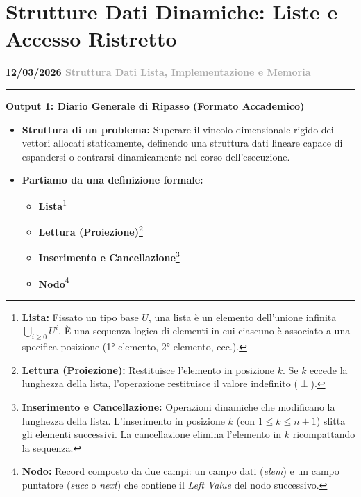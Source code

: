 \documentclass[a4paper, 11pt]{report}
\newcommand{\lezione}[2]{
\vspace{2em}
\noindent\textbf{\Large #1 \hfill \textcolor{darkgray}{#2}}
\vspace{0.5em}
\hrule
\vspace{1.5em}
}
\newcommand{\definizione}[2]{%
\textbf{#1}\footnote{\textbf{#1:} #2}%
}
\begin{document}
\chapter{Strutture Dati Dinamiche: Liste e Accesso Ristretto}

\lezione{12/03/2026}{Struttura Dati Lista, Implementazione e Memoria}
\vspace{0.5cm}
\textbf{Output 1: Diario Generale di Ripasso (Formato Accademico)}
\begin{itemize}
\item \textbf{Struttura di un problema:}
Superare il vincolo dimensionale rigido dei vettori allocati staticamente, definendo una struttura dati lineare capace di espandersi o contrarsi dinamicamente nel corso dell'esecuzione.

\item \textbf{Partiamo da una definizione formale:}
\begin{itemize}
    \item \definizione{Lista}{Fissato un tipo base $U$, una lista è un elemento dell'unione infinita $\bigcup_{i \ge 0} U^i$. È una sequenza logica di elementi in cui ciascuno è associato a una specifica posizione (1° elemento, 2° elemento, ecc.).}
    \item \definizione{Lettura (Proiezione)}{Restituisce l'elemento in posizione $k$. Se $k$ eccede la lunghezza della lista, l'operazione restituisce il valore indefinito ($\perp$).}
    \item \definizione{Inserimento e Cancellazione}{Operazioni dinamiche che modificano la lunghezza della lista. L'inserimento in posizione $k$ (con $1 \le k \le n+1$) slitta gli elementi successivi. La cancellazione elimina l'elemento in $k$ ricompattando la sequenza.}
    \item \definizione{Nodo}{Record composto da due campi: un campo dati (\textit{elem}) e un campo puntatore (\textit{succ} o \textit{next}) che contiene il \textit{Left Value} del nodo successivo.}
\end{itemize}


\end{itemize}
\end{document}
